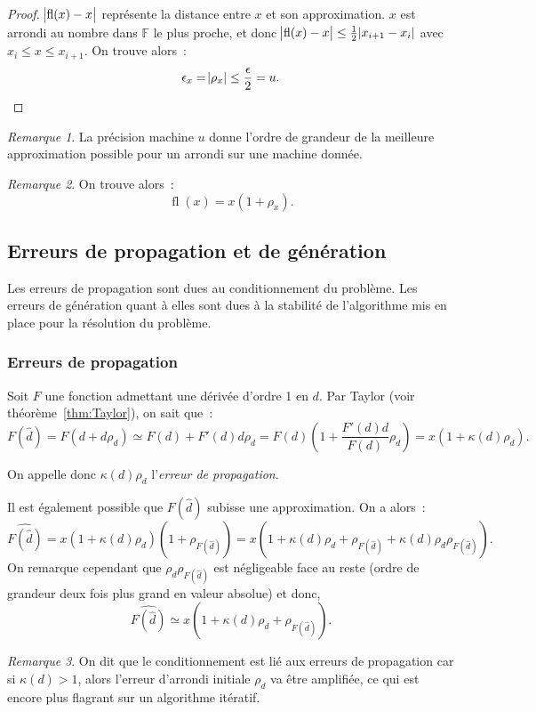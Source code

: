 \documentclass{article}
\theoremstyle{definition}
\theoremstyle{remark}
\newtheorem*{rmq}{Remarque}
\DeclareMathOperator{\fl}{fl}  %
\newcommand{\F}{\mathbb F}
\newcommand{\R}{\mathbb R}
\begin{document}
		\begin{proof} $\abs {\fl(x)-x}$ représente la distance entre $x$ et son approximation. $x$ est arrondi au nombre dans $\F$ le plus proche, et donc
		$\abs {\fl(x)-x} \leq \frac 12\abs{x_{i+1}-x_{i}}$ avec $x_i \leq x \leq x_{i+1}$. On trouve alors~:
		\[\epsilon_x = \abs {\rho_x} \leq \frac \epsilon2 = u.\]
		\end{proof}

		\begin{rmq} La précision machine $u$ donne l'ordre de grandeur de la meilleure approximation possible pour un arrondi sur une machine donnée. \end{rmq}

		\begin{rmq} On trouve alors~:
		\[\fl(x) = x(1 + \rho_x).\]
		\end{rmq}

	\subsection{Erreurs de propagation et de génération}
		Les erreurs de propagation sont dues au conditionnement du problème. Les erreurs de génération quant à elles sont dues à la stabilité de l'algorithme
		mis en place pour la résolution du problème.

		\subsubsection{Erreurs de propagation}
		Soit $F$ une fonction admettant une dérivée d'ordre 1 en $d$. Par Taylor (voir théorème~\ref{thm:Taylor}), on sait que~:
		\[F(\widehat d) = F(d + d\rho_d) \simeq F(d) + F'(d)d\rho_d = F(d)\left(1 + \frac {F'(d)d}{F(d)}\rho_d\right) = x(1 + \kappa(d)\rho_d).\]

		On appelle donc $\kappa(d)\rho_d$ l'\emph{erreur de propagation}.

		Il est également possible que $F(\widehat d)$ subisse une approximation. On a alors~:
		\[\widehat {F(\widehat d)} = x(1 + \kappa(d)\rho_d)(1 + \rho_{F(\widehat d)})
		= x(1 + \kappa(d)\rho_d + \rho_{F(\widehat d)} + \kappa(d)\rho_d\rho_{F(\widehat d)}).\]
		On remarque cependant que $\rho_d\rho_{F(\widehat d)}$ est négligeable face au reste (ordre de grandeur deux fois plus grand en valeur absolue) et donc,
		\[\widehat {F(\widehat d)} \simeq x(1 + \kappa(d)\rho_d + \rho_{F(\widehat d)}).\]

		\begin{rmq} On dit que le conditionnement est lié aux erreurs de propagation car si $\kappa(d) > 1$, alors l'erreur d'arrondi initiale $\rho_d$ va être
		amplifiée, ce qui est encore plus flagrant sur un algorithme itératif.
		\end{rmq}
\end{document}
